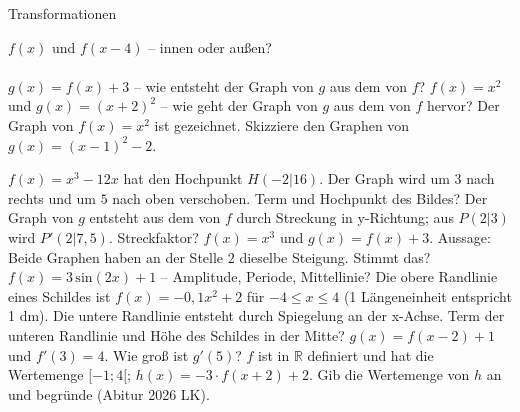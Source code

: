 \setcounter{aufgabe}{18}

\begin{aufgabe}{Transformationen}
\begin{teile}
\teil $f(x)$ und $f(x - 4)$ – innen oder außen? \\  \\ 
\teil $g(x) = f(x) + 3$ – wie entsteht der Graph von $g$ aus dem von $f$?
\teil $f(x) = x^2$ und $g(x) = (x + 2)^2$ – wie geht der Graph von $g$ aus dem von $f$ hervor?
\teil Der Graph von $f(x) = x^2$ ist gezeichnet. Skizziere den Graphen von $g(x) = (x - 1)^2 - 2$.

\begin{ksys}[xmin=-4,xmax=4,ymin=-3,ymax=5]\end{ksys}
\teil $f(x) = x^3 - 12x$ hat den Hochpunkt $H(-2 | 16)$. Der Graph wird um $3$ nach rechts und um $5$ nach oben verschoben. Term und Hochpunkt des Bildes?
\teil Der Graph von $g$ entsteht aus dem von $f$ durch Streckung in y-Richtung; aus $P(2 | 3)$ wird $P'(2 | 7{,}5)$. Streckfaktor?
\teil $f(x) = x^3$ und $g(x) = f(x) + 3$. Aussage: Beide Graphen haben an der Stelle $2$ dieselbe Steigung. Stimmt das?
\teil $f(x) = 3\,\mathrm{sin}(2x) + 1$ – Amplitude, Periode, Mittellinie?
\teil Die obere Randlinie eines Schildes ist $f(x) = -0{,}1x^2 + 2$ für $-4 \le x \le 4$ (1 Längeneinheit entspricht 1 dm). Die untere Randlinie entsteht durch Spiegelung an der x-Achse. Term der unteren Randlinie und Höhe des Schildes in der Mitte?
\teil $g(x) = f(x - 2) + 1$ und $f'(3) = 4$. Wie groß ist $g'(5)$?
\teil $f$ ist in $\mathbb{R}$ definiert und hat die Wertemenge $[-1; 4[$; $h(x) = -3 \cdot f(x + 2) + 2$. Gib die Wertemenge von $h$ an und begründe \hfill (Abitur 2026 LK).
\end{teile}
\end{aufgabe}


